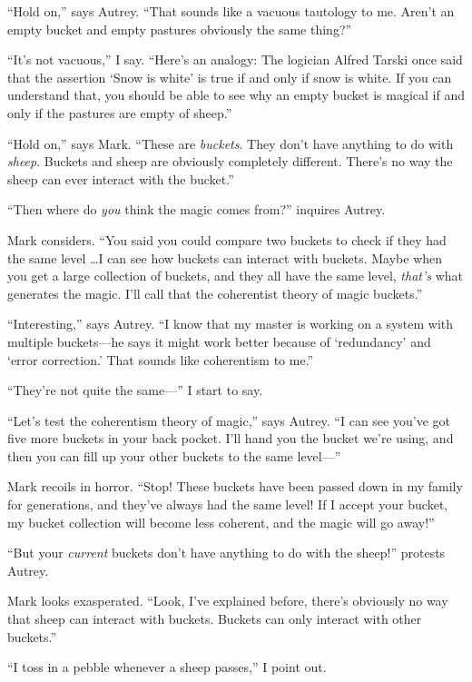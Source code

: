 {
 ``Hold on,'' says Autrey.
``That sounds like a vacuous tautology to me.
Aren't an empty bucket and empty pastures obviously the
same thing?''}

{
 ``It's not
vacuous,'' I say.
``Here's an analogy: The logician
Alfred Tarski once said that the assertion `Snow is
white' is true if and only if snow is white. If you can
understand that, you should be able to see why an empty bucket is
magical if and only if the pastures are empty of
sheep.''}

{
 ``Hold on,'' says Mark.
``These are \textit{buckets}. They
don't have anything to do with \textit{sheep}. Buckets
and sheep are obviously completely different. There's
no way the sheep can ever interact with the
bucket.''}

{
 ``Then where do \textit{you} think the magic
comes from?'' inquires Autrey.}

{
 Mark considers. ``You said you could compare two
buckets to check if they had the same level \ldots I can see how buckets
can interact with buckets. Maybe when you get a large collection of
buckets, and they all have the same level,
\textit{that's} what generates the magic.
I'll call that the coherentist theory of magic
buckets.''}

{
 ``Interesting,'' says Autrey.
``I know that my master is working on a system with
multiple buckets---he says it might work better because of
`redundancy' and `error
correction.' That sounds like coherentism to
me.''}

{
 ``They're not quite the
same---'' I start to say.}

{
 ``Let's test the coherentism
theory of magic,'' says Autrey. ``I
can see you've got five more buckets in your back
pocket. I'll hand you the bucket we're
using, and then you can fill up your other buckets to the same
level---''}

{
 Mark recoils in horror. ``Stop! These buckets
have been passed down in my family for generations, and
they've always had the same level! If I accept your
bucket, my bucket collection will become less coherent, and the magic
will go away!''}

{
 ``But your \textit{current} buckets
don't have anything to do with the
sheep!'' protests Autrey.}

{
 Mark looks exasperated. ``Look,
I've explained before, there's
obviously no way that sheep can interact with buckets. Buckets can only
interact with other buckets.''}

{
 ``I toss in a pebble whenever a sheep
passes,'' I point out.}

